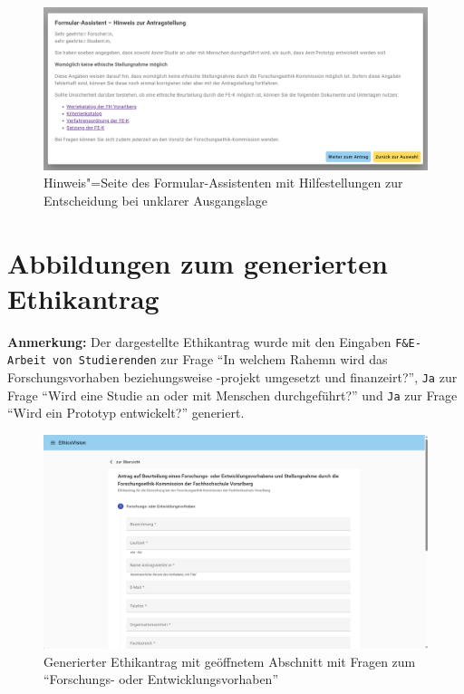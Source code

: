 \documentclass[a4paper,12pt,twoside,numbers=noendperiod]{scrreprt}
\begin{document}
\begin{figure}[htp!]
    \centering
    \includegraphics[width=\linewidth]{thesis/images/Luidold_EthicsVision-Formular-Assistent_Rethink-Screen.png}
    \caption{Hinweis"=Seite des Formular-Assistenten mit Hilfestellungen zur Entscheidung bei unklarer Ausgangslage}
    \label{fig:ethics-vision-formular-assistent-rethink-screen}
\end{figure}

\section{Abbildungen zum generierten Ethikantrag}
\label{appendix:ethics-vision-formular}

\textbf{Anmerkung:} Der dargestellte Ethikantrag wurde mit den Eingaben \texttt{F\&E- Arbeit von Studierenden} zur Frage \enquote{In welchem Rahemn wird das Forschungsvorhaben beziehungsweise -projekt umgesetzt und finanzeirt?}, \texttt{Ja} zur Frage \enquote{Wird eine Studie an oder mit Menschen durchgeführt?} und \texttt{Ja} zur Frage \enquote{Wird ein Prototyp entwickelt?} generiert.

\begin{figure}[ht]
    \centering
    \includegraphics[width=\linewidth]{thesis/images/Luidold_EthicsVision-Formular_Start.png}
    \caption{Generierter Ethikantrag mit geöffnetem Abschnitt mit Fragen zum \enquote{Forschungs- oder Entwicklungsvorhaben}}
    \label{fig:ethics-vision-formular-start}
\end{figure}
\end{document}
